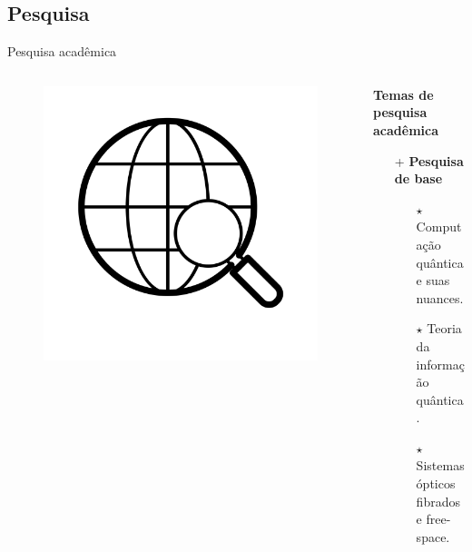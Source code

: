 \documentclass{beamer}
\begin{document}
\subsection{Pesquisa}
%
\begin{frame}{Pesquisa acadêmica}
    \begin{columns}[T] %
        \begin{column}{.1\textwidth}
            \begin{figure}[h!]
                \centering
                \includegraphics[scale=0.2]{pesq.png}
            \end{figure}
        \end{column}%
        \hfill%
        \hspace{0.2cm}
        \begin{column}{.8\textwidth}
            \textbf{Temas de pesquisa acadêmica}
            \begin{itemize}
                \item [+] \textbf{Pesquisa de base} 
                \begin{itemize}
                    \item [$\star$] Computação quântica e suas nuances.
                    \item [$\star$] Teoria da informação quântica.
                    \item [$\star$] Sistemas ópticos fibrados e free-space.

\end{itemize}
\end{itemize}
\end{column}
\end{columns}
\end{frame}
\end{document}
